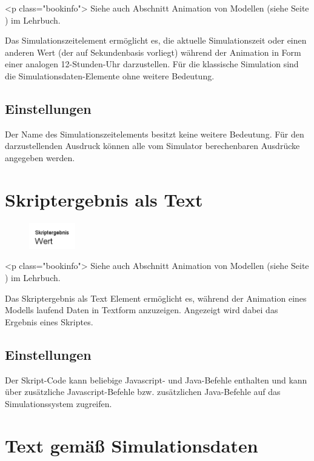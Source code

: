 <p class="bookinfo">
Siehe auch Abschnitt Animation von Modellen (siehe Seite \pageref{ref:book:5.4.3}) im Lehrbuch.

Das Simulationszeitelement ermöglicht es, die aktuelle Simulationszeit oder einen anderen Wert
(der auf Sekundenbasis vorliegt) während der Animation in Form einer analogen 12-Stunden-Uhr darzustellen.
Für die klassische Simulation sind die Simulationsdaten-Elemente ohne weitere Bedeutung.

\subsection*{Einstellungen}

Der Name des Simulationszeitelements besitzt keine weitere Bedeutung.
Für den darzustellenden Ausdruck können alle vom Simulator berechenbaren Ausdrücke angegeben werden.


\section{Skriptergebnis als Text}
\label{ref:ModelElementAnimationTextJS}

\begin{figure}
\vspace{-22pt}
\includegraphics[width=2cm]{imageModelElementAnimationTextJS.png}
\vspace{-22pt}
\end{figure}

<p class="bookinfo">
Siehe auch Abschnitt Animation von Modellen (siehe Seite \pageref{ref:book:5.4.3}) im Lehrbuch.

Das Skriptergebnis als Text Element ermöglicht es, während der Animation eines Modells laufend Daten in Textform anzuzeigen.
Angezeigt wird dabei das Ergebnis eines Skriptes.

\subsection*{Einstellungen}

Der Skript-Code kann beliebige Javascript- und Java-Befehle enthalten und kann über
zusätzliche Javascript-Befehle bzw. zusätzlichen Java-Befehle 
auf das Simulationssystem zugreifen.


\section{Text gemäß Simulationsdaten}
\label{ref:ModelElementAnimationTextSelect}

